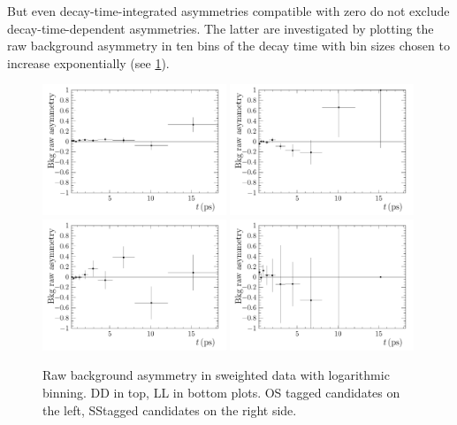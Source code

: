 But even decay-time-integrated asymmetries compatible with zero do not exclude
decay-time-dependent asymmetries. The latter are investigated by plotting the
raw background asymmetry in ten bins of the decay time with bin sizes chosen
to increase exponentially (see \cref{fig:background_asymmetry_sweighted}).
\begin{figure}[htb]
\centering
\includegraphics[width=0.49\textwidth]{06-Bd2JpsiKS/tikz/pdf/BackgroundAsymmetryByHand_DD_OS_data.pdf}
\includegraphics[width=0.49\textwidth]{06-Bd2JpsiKS/tikz/pdf/BackgroundAsymmetryByHand_DD_SSPion_data.pdf}\\
\includegraphics[width=0.49\textwidth]{06-Bd2JpsiKS/tikz/pdf/BackgroundAsymmetryByHand_LL_OS_data.pdf}
\includegraphics[width=0.49\textwidth]{06-Bd2JpsiKS/tikz/pdf/BackgroundAsymmetryByHand_LL_SSPion_data.pdf}
\caption{Raw background asymmetry in sweighted data with logarithmic binning.
DD in top, LL in bottom plots. OS tagged candidates on the left, SS\pion tagged
candidates on the right side.}
\label{fig:background_asymmetry_sweighted}
\end{figure}
